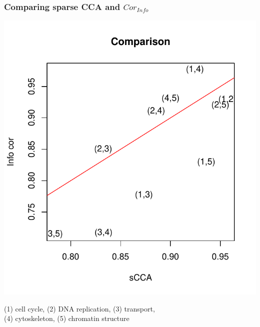 \documentclass{beamer}
\begin{document}
\begin{frame}
\frametitle{Comparing sparse CCA and $Cor_{Info}$}
\begin{center}
\includegraphics[scale = 0.5]{../idloss/cca_p_vs_info_cor.pdf}
\end{center}
(1) cell cycle, (2) DNA replication, (3) transport, \\
(4) cytoskeleton, (5) chromatin structure
\end{frame}
\end{document}
